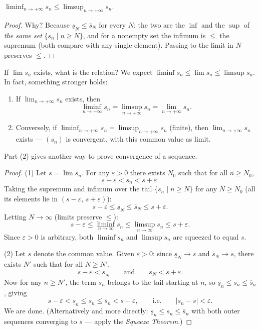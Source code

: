 \documentclass[11pt]{report}
\begin{document}
\begin{propbox}
$\displaystyle \liminf_{n\to+\infty} s_n \leq \limsup_{n\to+\infty} s_n$.
\end{propbox}

\begin{proof}
Why? Because $\underline{s}_N \leq \overline{s}_N$ for every $N$: the two are the $\inf$ and the $\sup$ of \emph{the same set} $\{s_n \mid n \geq N\}$, and for a nonempty set the infimum is $\leq$ the supremum (both compare with any single element). Passing to the limit in $N$ preserves $\leq$.
\end{proof}

If $\lim s_n$ exists, what is the relation? We expect $\liminf s_n \leq \lim s_n \leq \limsup s_n$. In fact, something stronger holds:

\begin{thmbox}
\begin{enumerate}[label=(\arabic*)]
    \item If $\lim_{n\to+\infty} s_n$ exists, then
    \[
    \liminf_{n\to+\infty} s_n = \limsup_{n\to+\infty} s_n = \lim_{n\to+\infty} s_n.
    \]
    \item Conversely, if $\liminf_{n\to+\infty} s_n = \limsup_{n\to+\infty} s_n$ (finite), then $\lim_{n\to+\infty} s_n$ exists --- $(s_n)$ is convergent, with this common value as limit.
\end{enumerate}
Part (2) gives another way to prove convergence of a sequence.
\end{thmbox}

\begin{proof}
(1) Let $s = \lim s_n$. For any $\varepsilon > 0$ there exists $N_0$ such that for all $n \geq N_0$,
\[
s - \varepsilon < s_n < s + \varepsilon.
\]
Taking the supremum and infimum over the tail $\{s_n \mid n \geq N\}$ for any $N \geq N_0$ (all its elements lie in $(s-\varepsilon,\, s+\varepsilon)$):
\[
s - \varepsilon \leq \underline{s}_N \leq \overline{s}_N \leq s + \varepsilon.
\]
Letting $N \to \infty$ (limits preserve $\leq$):
\[
s - \varepsilon \leq \liminf_{n\to\infty} s_n \leq \limsup_{n\to\infty} s_n \leq s + \varepsilon.
\]
Since $\varepsilon > 0$ is arbitrary, both $\liminf s_n$ and $\limsup s_n$ are squeezed to equal $s$.

(2) Let $s$ denote the common value. Given $\varepsilon > 0$: since $\underline{s}_N \to s$ and $\overline{s}_N \to s$, there exists $N'$ such that for all $N \geq N'$,
\[
s - \varepsilon < \underline{s}_N \qquad \text{and} \qquad \overline{s}_N < s + \varepsilon.
\]
Now for any $n \geq N'$, the term $s_n$ belongs to the tail starting at $n$, so $\underline{s}_n \leq s_n \leq \overline{s}_n$, giving
\[
s - \varepsilon < \underline{s}_n \leq s_n \leq \overline{s}_n < s + \varepsilon, \qquad \text{i.e.} \qquad |s_n - s| < \varepsilon.
\]
We are done. (Alternatively and more directly: $\underline{s}_n \leq s_n \leq \overline{s}_n$ with both outer sequences converging to $s$ --- apply the \emph{Squeeze Theorem}.)
\end{proof}
\end{document}
